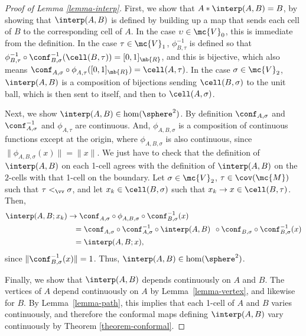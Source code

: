 \begin{proof}[Proof of Lemma \ref{lemma-interp}]
First, we show that $A* \interp(A,B) = B$, by showing that $\interp(A,B)$ is defined by building up a map that sends each cell of $B$ to the corresponding cell of $A$.
In the case $\upsilon \in \mc{V}_0$, this is immediate from the definition.
In the case $\tau \in \mc{V}_1$, $\phi_{B,\tau}^{-1}$ is defined so that $\hbox{$\phi_{B,\tau}^{-1} \circ \conf_{B,\sigma}^{-1}(\cell(B,\tau))$} = [0,1]_\mb{R}$, and this is bijective, which also means $\conf_{A,\sigma}^{\phantom1} \circ \phi_{A,\tau}^{\phantom1}([0,1]_\mb{R}) = \cell(A,\tau)$.
In the case $\sigma \in \mc{V}_2$, $\interp(A,B)$ is a composition of bijections sending $\cell(B,\sigma)$ to the unit ball, which is then sent to itself, and then to $\cell(A,\sigma)$.

Next, we show $\interp(A,B) \in \hom(\sphere^2)$.
By definition $\conf_{A,\sigma}$ and $\conf_{A,\sigma}^{-1}$ and $\phi_{A,\tau}$ are continuous.
And, $\phi_{A,B,\sigma}$ is a composition of continuous functions except at the origin, where $\phi_{A,B,\sigma}$ is also continuous, since $\|\phi_{A,B,\sigma}(x)\| = \|x\|$.
We just have to check that the definition of $\interp(A,B)$ on each 1-cell agrees with the definition of $\interp(A,B)$ on the $2$-cells with that 1-cell on the boundary.
Let $\sigma \in \mc{V}_2$, $\tau \in \cov(\mc{M})$ such that $\tau <_\vv \sigma$, and let $x_k \in \cell(B,\sigma)$ such that $x_k \to x \in \cell(B,\tau)$. Then,
\begin{align*}
\interp(A,B;x_k)
& \to \conf_{A,\sigma}^{\phantom1} \circ \phi_{A,B,\sigma}^{\phantom1} \circ \conf_{B,\sigma}^{-1}(x) \\
&\hspace*{2.8mm} = \conf_{A,\sigma}^{\phantom1} \circ \conf_{A,\sigma}^{-1} \circ \interp(A,B)^{\phantom1} \circ \conf_{B,\sigma}^{\phantom1} \circ \conf_{B,\sigma}^{-1}(x) \\
&\hspace*{2.8mm} = \interp(A,B;x),
\end{align*}
since $\| \conf_{B,\sigma}^{-1}(x) \| = 1$. Thus, $\interp(A,B) \in \hom(\sphere^2)$.

Finally, we show that $\interp(A,B)$ depends continuously on $A$ and $B$.
The vertices of $A$ depend continuously on $A$ by Lemma~\ref{lemma-vertex}, and likewise for $B$.
By Lemma~\ref{lemma-path}, this implies that each 1-cell of $A$ and $B$ varies continuously, and therefore the conformal maps defining $\interp(A,B)$ vary continuously by Theorem \ref{theorem-conformal}.
\end{proof}

